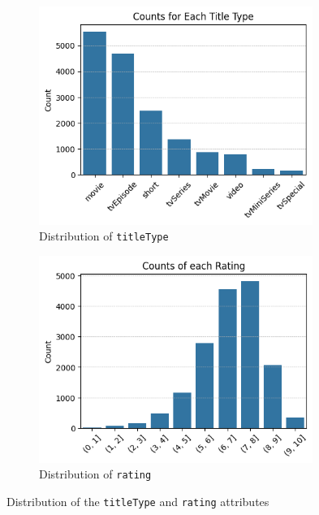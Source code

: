 \begin{figure}[H]
    \centering
    \begin{subfigure}{0.45\textwidth}
        \centering
        \includegraphics[width=0.98\textwidth]{plots/types_count.png}     %
        \caption{Distribution of \texttt{titleType}}
        \captionsetup{width=0.9\linewidth, justification=centering}
        \label{fig:titleType_distrib}
    \end{subfigure}
    \begin{subfigure}{0.47\textwidth}
        \centering
        \includegraphics[width=0.98\textwidth]{plots/rating_distrib.png}     %
        \caption{Distribution of \texttt{rating}}
        \captionsetup{width=0.9\linewidth, justification=centering}
        \label{fig:rating_distrib}
    \end{subfigure}
    \captionsetup{justification=centering}
    \caption{Distribution of the \texttt{titleType} and \texttt{rating} attributes}
    \label{fig:distrib_categorical}
\end{figure}

